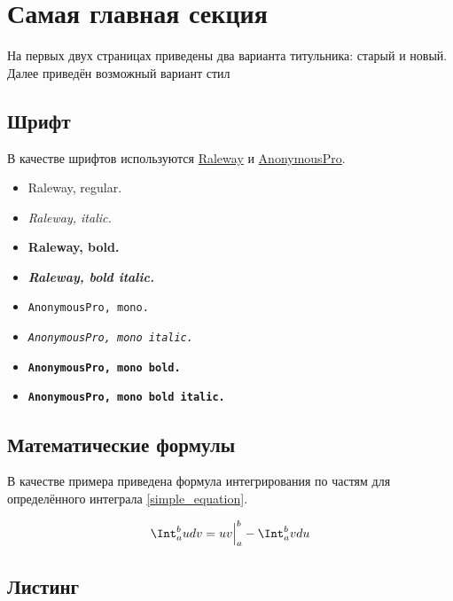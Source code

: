 \section{Самая главная секция}

На первых двух страницах приведены два варианта титульника: старый и новый. Далее приведён возможный вариант стил


\subsection{Шрифт}

В качестве шрифтов используются \href{https://fonts.google.com/specimen/Raleway}{Raleway} и \href{https://fonts.google.com/specimen/Anonymous+Pro}{AnonymousPro}.

\begin{multicols}{2}
    \begin{itemize}
        \item Raleway, regular.
        \item \textit{Raleway, italic.}
        \item \textbf{Raleway, bold.}
        \item \textbf{\textit{Raleway, bold italic.}}
        \item \texttt{AnonymousPro, mono.}
        \item \textit{\texttt{AnonymousPro, mono italic.}}
        \item \textbf{\texttt{AnonymousPro, mono bold.}}
        \item \textbf{\texttt{AnonymousPro, mono bold italic.}}
    \end{itemize}
\end{multicols}


\subsection{Математические формулы}

В качестве примера приведена формула интегрирования по частям для определённого интеграла \eqref{simple_equation}.

\begin{equation} \label{simple_equation}
\Int_a^b u dv = uv \Big|_a^b - \Int_a^b v du
\end{equation}


\subsection{Листинг}

